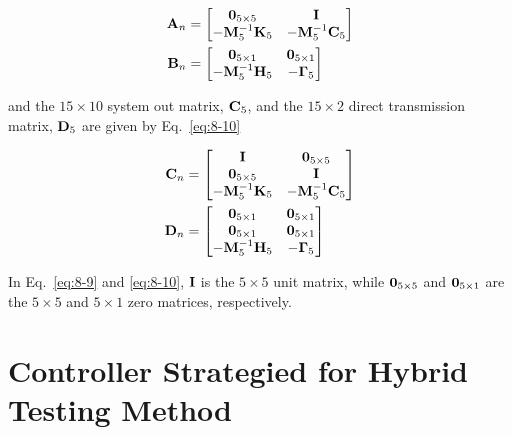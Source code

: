 \begin{equation}\label{eq:8-9}
\begin{aligned}
\mathbf{A}_{n} & = \begin{bmatrix} \mathbf{0}_{5\times5} & \mathbf{I} \\ -\mathbf{M}_{5}^{-1}\mathbf{K}_{5} & -\mathbf{M}_{5}^{-1}\mathbf{C}_{5}\end{bmatrix} \\
\mathbf{B}_{n} & = \begin{bmatrix} \mathbf{0}_{5\times1} & \mathbf{0}_{5\times1} \\ -\mathbf{M}_{5}^{-1}\mathbf{H}_{5} & -\mathbf{\Gamma}_{5} \end{bmatrix}
\end{aligned}
\end{equation}

and the $15\times10$ system out matrix, $\mathbf{C}_{5}$, and the $15\times2$ direct transmission matrix, $\mathbf{D}_{5}$ are given by Eq.~\eqref{eq:8-10}

\begin{equation}\label{eq:8-10}
\begin{aligned}
\mathbf{C}_{n} & = \begin{bmatrix} \mathbf{I} & \mathbf{0}_{5\times5} \\ \mathbf{0}_{5\times5} & \mathbf{I} \\ -\mathbf{M}_{5}^{-1}\mathbf{K}_{5} & -\mathbf{M}_{5}^{-1}\mathbf{C}_{5}\end{bmatrix} \\
\mathbf{D}_{n} & = \begin{bmatrix} \mathbf{0}_{5\times1} & \mathbf{0}_{5\times1} \\ \mathbf{0}_{5\times1} & \mathbf{0}_{5\times1} \\ -\mathbf{M}_{5}^{-1}\mathbf{H}_{5} & -\mathbf{\Gamma}_{5} \end{bmatrix}
\end{aligned}
\end{equation}

In Eq.~\eqref{eq:8-9} and \eqref{eq:8-10}, $\mathbf{I}$ is the $5\times5$ unit matrix, while $\mathbf{0}_{5\times5}$ and $\mathbf{0}_{5\times1}$ are the $5\times5$ and $5\times1$ zero matrices, respectively.

\section{Controller Strategied for Hybrid Testing Method}
